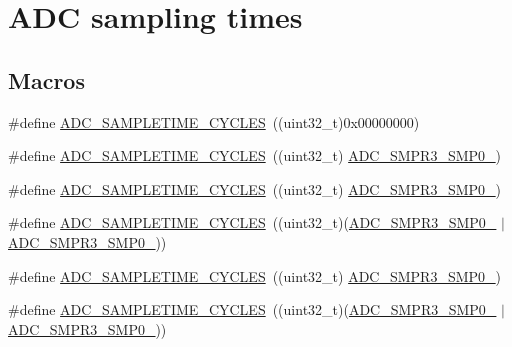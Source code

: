 \hypertarget{group___a_d_c__sampling__times}{\section{A\-D\-C sampling times}
\label{group___a_d_c__sampling__times}
}
\subsection*{Macros}
\begin{DoxyCompactItemize}
\item 
\#define \hyperlink{group___a_d_c__sampling__times_ga3728aca9c956ddbfd8a5ee3911da4c42}{A\-D\-C\-\_\-\-S\-A\-M\-P\-L\-E\-T\-I\-M\-E\-\_\-C\-Y\-C\-L\-E\-S}~((uint32\-\_\-t)0x00000000)
\item 
\#define \hyperlink{group___a_d_c__sampling__times_ga3247cf2436bd0b78d0b14cee186124eb}{A\-D\-C\-\_\-\-S\-A\-M\-P\-L\-E\-T\-I\-M\-E\-\_\-C\-Y\-C\-L\-E\-S}~((uint32\-\_\-t) \hyperlink{group___peripheral___registers___bits___definition_gadf138bd8fbaf39642716d014799f4c85}{A\-D\-C\-\_\-\-S\-M\-P\-R3\-\_\-\-S\-M\-P0\-\_})
\item 
\#define \hyperlink{group___a_d_c__sampling__times_gaf15bcf0a46629dd2fdc7ea573f277f10}{A\-D\-C\-\_\-\-S\-A\-M\-P\-L\-E\-T\-I\-M\-E\-\_\-C\-Y\-C\-L\-E\-S}~((uint32\-\_\-t) \hyperlink{group___peripheral___registers___bits___definition_gac3c009d8ba490ce850028b7bff9c5a8f}{A\-D\-C\-\_\-\-S\-M\-P\-R3\-\_\-\-S\-M\-P0\-\_})
\item 
\#define \hyperlink{group___a_d_c__sampling__times_ga033ce520948d4617b2299ce3e3462dc6}{A\-D\-C\-\_\-\-S\-A\-M\-P\-L\-E\-T\-I\-M\-E\-\_\-C\-Y\-C\-L\-E\-S}~((uint32\-\_\-t)(\hyperlink{group___peripheral___registers___bits___definition_gac3c009d8ba490ce850028b7bff9c5a8f}{A\-D\-C\-\_\-\-S\-M\-P\-R3\-\_\-\-S\-M\-P0\-\_} $\vert$ \hyperlink{group___peripheral___registers___bits___definition_gadf138bd8fbaf39642716d014799f4c85}{A\-D\-C\-\_\-\-S\-M\-P\-R3\-\_\-\-S\-M\-P0\-\_}))
\item 
\#define \hyperlink{group___a_d_c__sampling__times_gadfa71db29ab3802561a460c41970dd60}{A\-D\-C\-\_\-\-S\-A\-M\-P\-L\-E\-T\-I\-M\-E\-\_\-C\-Y\-C\-L\-E\-S}~((uint32\-\_\-t) \hyperlink{group___peripheral___registers___bits___definition_gab186002e7254bf71029ad9486b2f4cfd}{A\-D\-C\-\_\-\-S\-M\-P\-R3\-\_\-\-S\-M\-P0\-\_})
\item 
\#define \hyperlink{group___a_d_c__sampling__times_ga4f6f7e5b1dc793eacb3ce87714be7862}{A\-D\-C\-\_\-\-S\-A\-M\-P\-L\-E\-T\-I\-M\-E\-\_\-C\-Y\-C\-L\-E\-S}~((uint32\-\_\-t)(\hyperlink{group___peripheral___registers___bits___definition_gab186002e7254bf71029ad9486b2f4cfd}{A\-D\-C\-\_\-\-S\-M\-P\-R3\-\_\-\-S\-M\-P0\-\_} $\vert$ \hyperlink{group___peripheral___registers___bits___definition_gadf138bd8fbaf39642716d014799f4c85}{A\-D\-C\-\_\-\-S\-M\-P\-R3\-\_\-\-S\-M\-P0\-\_}))

\end{DoxyCompactItemize}
